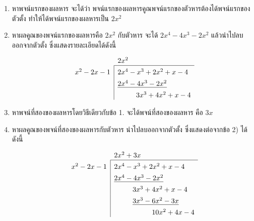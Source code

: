 \begin{conceptbox}
	\begin{enumerate}
		\item หาพจน์แรกของผลหาร จะได้ว่า พจน์แรกของผลหารคูณพจน์แรกของตัวหารต้องได้พจน์แรกของตัวตั้ง ทำให้ได้พจน์แรกของผลหารเป็น $2x^2$
		
		\item หาผลคูณของพจน์แรกของผลหารคือ $2x^2$ กับตัวหาร จะได้ $2x^4 - 4x^3 - 2x^2$ แล้วนำไปลบออกจากตัวตั้ง ซึ่งแสดงรายละเอียดได้ดังนี้
		\[
		\setlength{\extrarowheight}{1.0ex} %
		\begin{array}{r|l}
			\multicolumn{1}{c}{} & 2x^2 \\ \cline{2-2}
			x^2 - 2x - 1 & 2x^4 - x^3 + 2x^2 + x - 4 \\
			& \underline{2x^4 - 4x^3 - 2x^2} \\
			& \phantom{2x^4 - \ } 3x^3 + 4x^2 + x - 4
		\end{array}
		\]
		
		\item หาพจน์ที่สองของผลหารโดยวิธีเดียวกับข้อ 1. จะได้พจน์ที่สองของผลหาร คือ $3x$
		
		\item หาผลคูณของพจน์ที่สองของผลหารกับตัวหาร นำไปลบออกจากตัวตั้ง ซึ่งแสดงต่อจากข้อ 2) ได้ดังนี้
		\[
		\setlength{\extrarowheight}{1.0ex} %
		\begin{array}{r|l}
			\multicolumn{1}{c}{} & 2x^2 + 3x \\ \cline{2-2}
			x^2 - 2x - 1 & 2x^4 - x^3 + 2x^2 + x - 4 \\
			& \underline{2x^4 - 4x^3 - 2x^2} \\
			& \phantom{2x^4 - \ } 3x^3 + 4x^2 + x - 4 \\
			& \phantom{2x^4 - \ } \underline{3x^3 - 6x^2 - 3x} \\
			& \phantom{2x^4 - 3x^3 - \ } 10x^2 + 4x - 4
		\end{array}
		\]
		

\end{enumerate}
\end{conceptbox}
